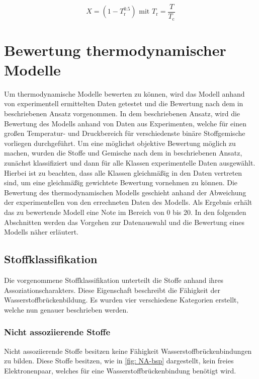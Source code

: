 \documentclass[../thesis.tex]{subfiles}
\begin{document}
\begin{equation}
	X = \left( 1 - T_\mathrm{r}^{0\text{.}5} \right) \text{ mit } T_\mathrm{r} = \dfrac{T}{T_\mathrm{c}}
	\label{eq: a_i_sup}
\end{equation}

\section{Bewertung thermodynamischer Modelle}

Um thermodynamische Modelle bewerten zu können, wird das Modell anhand von experimentell ermittelten Daten getestet und die Bewertung nach dem in \cite{jaubert2020benchmark} beschriebenen Ansatz vorgenommen. In dem beschriebenen Ansatz, wird die Bewertung des Modells anhand von Daten aus Experimenten, welche für einen großen Temperatur- und Druckbereich für verschiedenste binäre Stoffgemische vorliegen durchgeführt. Um eine möglichst objektive Bewertung möglich zu machen, wurden die Stoffe und Gemische nach dem in \cite{jaubert2020benchmark} beschriebenen Ansatz, zunächst klassifiziert und dann für alle Klassen experimentelle Daten ausgewählt. Hierbei ist zu beachten, dass alle Klassen gleichmäßig in den Daten vertreten sind, um eine gleichmäßig gewichtete Bewertung vornehmen zu können.
Die Bewertung des thermodynamischen Modells geschieht anhand der Abweichung der experimentellen von den errechneten Daten des Modells. Als Ergebnis erhält das zu bewertende Modell eine Note im Bereich von 0 bis 20.
In den folgenden Abschnitten werden das Vorgehen zur Datenauswahl und die Bewertung eines Modells näher erläutert.

\subsection{Stoffklassifikation}
\label{sec: klassifikation}

Die vorgenommene Stoffklassifikation unterteilt die Stoffe anhand ihres Assoziationscharakters. Diese Eigenschaft beschreibt die Fähigkeit der Wasserstoffbrückenbildung. Es wurden vier verschiedene Kategorien erstellt, welche nun genauer beschrieben werden.

\subsubsection{Nicht assoziierende Stoffe}

Nicht assoziierende Stoffe besitzen keine Fähigkeit Wasserstoffbrückenbindungen zu bilden. Diese Stoffe besitzen, wie in \autoref{fig: NA-bsp} dargestellt, kein freies Elektronenpaar, welches für eine Wasserstoffbrückenbindung benötigt wird.
\end{document}
